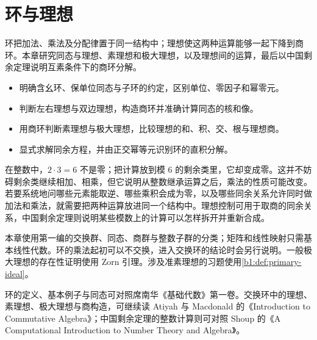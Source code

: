 
\chapter{环与理想}
\label{b1:ch:10}

\begin{chapterabstract}
	环把加法、乘法及分配律置于同一结构中；理想使这两种运算能够一起下降到商环。本章研究同态与理想、素理想和极大理想，以及理想间的运算，最后以中国剩余定理说明互素条件下的商环分解。
\end{chapterabstract}

\begin{learninggoals}
	\begin{itemize}
		\item 明确含幺环、保单位同态与子环的约定，区别单位、零因子和幂零元。
		\item 判断左右理想与双边理想，构造商环并准确计算同态的核和像。
		\item 用商环判断素理想与极大理想，比较理想的和、积、交、根与理想商。
		\item 显式求解同余方程，并由正交幂等元识别环的直积分解。
	\end{itemize}
\end{learninggoals}

在整数中，\(2\cdot3=6\) 不是零；把计算放到模 \(6\) 的剩余类里，它却变成零。这并不妨碍剩余类继续相加、相乘，但它说明从整数继承运算之后，乘法的性质可能改变。若要系统地问哪些元素能取逆、哪些乘积会成为零，以及哪些同余关系允许同时做加法和乘法，就需要把两种运算放进同一个结构中。理想控制可用于取商的同余关系，中国剩余定理则说明某些模数上的计算可以怎样拆开并重新合成。

\ProseParagraphBreak

本章使用第一编的交换群、同态、商群与整数子群的分类；矩阵和线性映射只需基本线性代数。环的乘法起初可以不交换，进入交换环的结论时会另行说明。一般极大理想的存在性证明使用 Zorn 引理。涉及准素理想的习题使用\cref{b1:def:primary-ideal}。

\ProseParagraphBreak
环的定义、基本例子与同态可对照席南华《基础代数》第一卷\cite[第5章第5.3节]{Xi2016BasicAlgebraI}。交换环中的理想、素理想、极大理想与商构造，可继续读 Atiyah 与 Macdonald 的《Introduction to Commutative Algebra》\cite[Chapter 1]{AtiyahMacdonald1969CommutativeAlgebra}；中国剩余定理的整数计算则可对照 Shoup 的《A Computational Introduction to Number Theory and Algebra》\cite[Section 4.3]{Shoup2008NumberTheoryAlgebra}。

